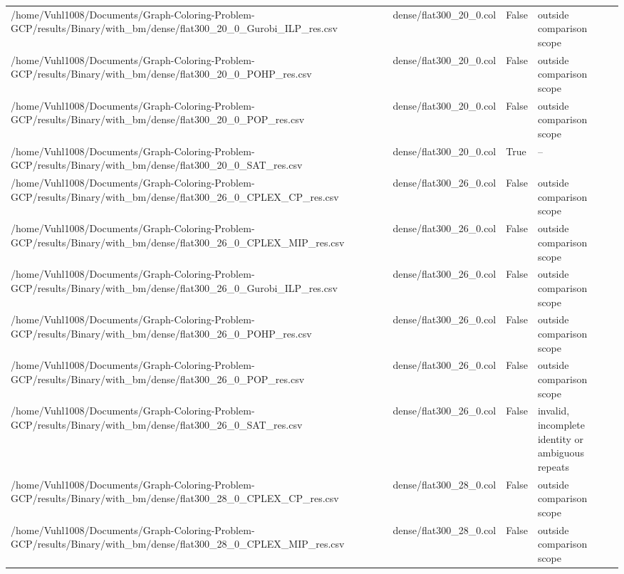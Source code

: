 \begin{table}[htbp]
\begin{tabular}{llll}
/home/Vuhl1008/Documents/Graph-Coloring-Problem-GCP/results/Binary/with\_bm/dense/flat300\_20\_0\_Gurobi\_ILP\_res.csv & dense/flat300\_20\_0.col & False & outside comparison scope \\
/home/Vuhl1008/Documents/Graph-Coloring-Problem-GCP/results/Binary/with\_bm/dense/flat300\_20\_0\_POHP\_res.csv & dense/flat300\_20\_0.col & False & outside comparison scope \\
/home/Vuhl1008/Documents/Graph-Coloring-Problem-GCP/results/Binary/with\_bm/dense/flat300\_20\_0\_POP\_res.csv & dense/flat300\_20\_0.col & False & outside comparison scope \\
/home/Vuhl1008/Documents/Graph-Coloring-Problem-GCP/results/Binary/with\_bm/dense/flat300\_20\_0\_SAT\_res.csv & dense/flat300\_20\_0.col & True & -- \\
/home/Vuhl1008/Documents/Graph-Coloring-Problem-GCP/results/Binary/with\_bm/dense/flat300\_26\_0\_CPLEX\_CP\_res.csv & dense/flat300\_26\_0.col & False & outside comparison scope \\
/home/Vuhl1008/Documents/Graph-Coloring-Problem-GCP/results/Binary/with\_bm/dense/flat300\_26\_0\_CPLEX\_MIP\_res.csv & dense/flat300\_26\_0.col & False & outside comparison scope \\
/home/Vuhl1008/Documents/Graph-Coloring-Problem-GCP/results/Binary/with\_bm/dense/flat300\_26\_0\_Gurobi\_ILP\_res.csv & dense/flat300\_26\_0.col & False & outside comparison scope \\
/home/Vuhl1008/Documents/Graph-Coloring-Problem-GCP/results/Binary/with\_bm/dense/flat300\_26\_0\_POHP\_res.csv & dense/flat300\_26\_0.col & False & outside comparison scope \\
/home/Vuhl1008/Documents/Graph-Coloring-Problem-GCP/results/Binary/with\_bm/dense/flat300\_26\_0\_POP\_res.csv & dense/flat300\_26\_0.col & False & outside comparison scope \\
/home/Vuhl1008/Documents/Graph-Coloring-Problem-GCP/results/Binary/with\_bm/dense/flat300\_26\_0\_SAT\_res.csv & dense/flat300\_26\_0.col & False & invalid, incomplete identity or ambiguous repeats \\
/home/Vuhl1008/Documents/Graph-Coloring-Problem-GCP/results/Binary/with\_bm/dense/flat300\_28\_0\_CPLEX\_CP\_res.csv & dense/flat300\_28\_0.col & False & outside comparison scope \\
/home/Vuhl1008/Documents/Graph-Coloring-Problem-GCP/results/Binary/with\_bm/dense/flat300\_28\_0\_CPLEX\_MIP\_res.csv & dense/flat300\_28\_0.col & False & outside comparison scope \\

\end{tabular}
\end{table}
